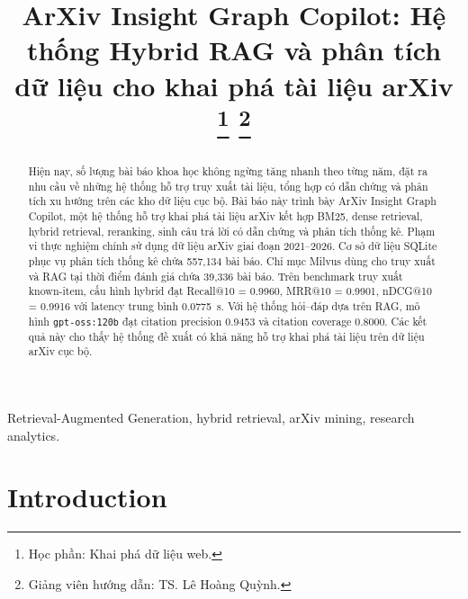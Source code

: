 \documentclass[conference]{IEEEtran}
\newcommand{\systemname}{ArXiv Insight Graph Copilot}
\begin{document}
\title{\systemname: Hệ thống Hybrid RAG và phân tích dữ liệu cho khai phá tài liệu arXiv%
\thanks{Học phần: Khai phá dữ liệu web.}
\thanks{Giảng viên hướng dẫn: TS. Lê Hoàng Quỳnh.}}

\author{
}

\maketitle

\begin{abstract}
Hiện nay, số lượng bài báo khoa học không ngừng tăng nhanh theo từng năm, đặt ra nhu cầu về những hệ thống hỗ trợ truy xuất tài liệu, tổng hợp có dẫn chứng và phân tích xu hướng trên các kho dữ liệu cục bộ. Bài báo này trình bày \systemname, một hệ thống hỗ trợ khai phá tài liệu arXiv kết hợp BM25, dense retrieval, hybrid retrieval, reranking, sinh câu trả lời có dẫn chứng và phân tích thống kê. Phạm vi thực nghiệm chính sử dụng dữ liệu arXiv giai đoạn 2021--2026. Cơ sở dữ liệu SQLite phục vụ phân tích thống kê chứa 557,134 bài báo. Chỉ mục Milvus dùng cho truy xuất và RAG tại thời điểm đánh giá chứa 39,336 bài báo. Trên benchmark truy xuất known-item, cấu hình hybrid đạt Recall@10 = 0.9960, MRR@10 = 0.9901, nDCG@10 = 0.9916 với latency trung bình 0.0775~s. Với hệ thống hỏi--đáp dựa trên RAG, mô hình \texttt{gpt-oss:120b} đạt citation precision 0.9453 và citation coverage 0.8000. Các kết quả này cho thấy hệ thống đề xuất có khả năng hỗ trợ khai phá tài liệu trên dữ liệu arXiv cục bộ.
\end{abstract}

\begin{IEEEkeywords}
Retrieval-Augmented Generation, hybrid retrieval, arXiv mining, research analytics.
\end{IEEEkeywords}

\section{Introduction}
\end{document}
